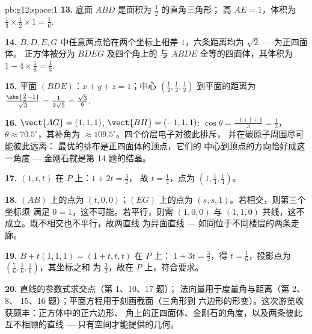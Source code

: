 \begin{solution}{pb:g12:space:1}
\textbf{13.} 底面 $ABD$ 是面积为 $\frac12$ 的直角三角形；
高 $AE = 1$，体积为
$\frac13 \times \frac12 \times 1 = \frac16$.

\textbf{14.} $B, D, E, G$ 中任意两点恰在两个坐标上相差
$1$，六条距离均为 $\sqrt2$ --- 为正四面体。
正方体被分为 $BDEG$ 及四个角上的
与 $ABDE$ 全等的四面体，其体积为
$1 - 4 \times \frac16 = \frac13$.

\textbf{15.} 平面 $(BDE)$：$x + y + z = 1$；中心
$\left(\frac12,\frac12,\frac12\right)$ 到平面的距离为
$\frac{\abs{\frac32 - 1}}{\sqrt3} = \frac{1}{2\sqrt3} =
\frac{\sqrt3}{6}$.

\textbf{16.} $\vect{AG} = (1,1,1)$,
$\vect{BH} = (-1,1,1)$: $\cos\theta = \frac{-1 + 1 + 1}{3} =
\frac13$，$\theta \approx 70.5^\circ$，其补角为
$\approx 109.5^\circ$。四个价层电子对彼此排斥，
并在碳原子周围尽可能彼此远离：
最优的排布是正四面体的顶点，它们的
中心到顶点的方向恰好成这一角度 ---
金刚石就是第 14 题的结晶。

\textbf{17.} $(1, t, t)$ 在 $P$ 上：$1 + 2t = \frac32$，
故 $t = \frac14$，点为 $\left(1, \frac14, \frac14\right)$。

\textbf{18.} $(AB)$ 上的点为 $(t, 0, 0)$；$(EG)$ 上的点为
$(s, s, 1)$。若相交，则第三个坐标须
满足 $0 = 1$，这不可能。若平行，则需 $(1,0,0)$ 与
$(1,1,0)$ 共线，这不成立。既不相交也不平行，故两直线
为异面直线 --- 如同位于不同楼层的两条走廊。

\textbf{19.} $B + t(1,1,1) = (1 + t, t, t)$ 在 $P$ 上：
$1 + 3t = \frac32$，得 $t = \frac16$，投影点为
$\left(\frac76, \frac16, \frac16\right)$，其坐标之和
为 $\frac32$，故在 $P$ 上，符合要求。

\textbf{20.} 直线的参数式求交点（第 1、10、17 题）；
法向量用于度量角与距离（第 2、8、
15、16 题）；平面方程用于刻画截面（三角形到
六边形的形变）。这次游览收获颇丰：正方体中的正六边形、
角上的正四面体、金刚石的角度，以及两条彼此
互不相顾的直线 ---
只有空间才能提供的几何。
\end{solution}
